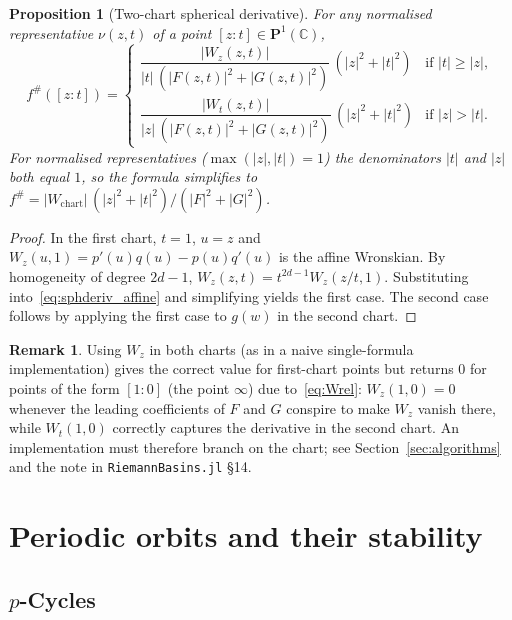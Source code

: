 \documentclass[12pt]{article}
\newtheorem{proposition}[theorem]{Proposition}
\theoremstyle{definition}
\newtheorem{remark}[theorem]{Remark}
\newcommand{\C}{\mathbb{C}}
\newcommand{\Pone}{\mathbf{P}^1(\C)}
\newcommand{\fsh}{f^{\#}}
\begin{document}
\begin{proposition}[Two-chart spherical derivative]\label{prop:sphderiv}
For any normalised representative $\nu(z,t)$ of a point
$[z:t]\in\Pone$,
\begin{equation}\label{eq:sphderiv_hom}
  \fsh([z:t]) =
  \begin{cases}
    \dfrac{|W_z(z,t)|}{|t|\,(|F(z,t)|^2+|G(z,t)|^2)}\,(|z|^2+|t|^2)
      & \text{if }|t|\geq|z|, \\[10pt]
    \dfrac{|W_t(z,t)|}{|z|\,(|F(z,t)|^2+|G(z,t)|^2)}\,(|z|^2+|t|^2)
      & \text{if }|z|>|t|.
  \end{cases}
\end{equation}
For normalised representatives ($\max(|z|,|t|)=1$) the denominators
$|t|$ and $|z|$ both equal $1$, so the formula simplifies to
$\fsh = |W_{\mathrm{chart}}|\,(|z|^2+|t|^2)/(|F|^2+|G|^2)$.
\end{proposition}

\begin{proof}
In the first chart, $t=1$, $u=z$ and
$W_z(u,1) = p'(u)q(u)-p(u)q'(u)$ is the affine Wronskian.
By homogeneity of degree $2d-1$, $W_z(z,t)=t^{2d-1}W_z(z/t,1)$.
Substituting into~\eqref{eq:sphderiv_affine} and simplifying yields the
first case.  The second case follows by applying the first case to $g(w)$
in the second chart.
\end{proof}

\begin{remark}\label{rem:chartbug}
Using $W_z$ in both charts (as in a naive single-formula implementation)
gives the correct value for first-chart points but returns $0$ for
points of the form $[1:0]$ (the point $\infty$) due to~\eqref{eq:Wrel}:
$W_z(1,0) = 0$ whenever the leading coefficients of $F$ and $G$
conspire to make $W_z$ vanish there, while $W_t(1,0)$ correctly
captures the derivative in the second chart.  An implementation must
therefore branch on the chart; see Section~\ref{sec:algorithms} and
the note in \texttt{RiemannBasins.jl} \S14.
\end{remark}

\section{Periodic orbits and their stability}
\label{sec:periodic}

\subsection{$p$-Cycles}
\end{document}
